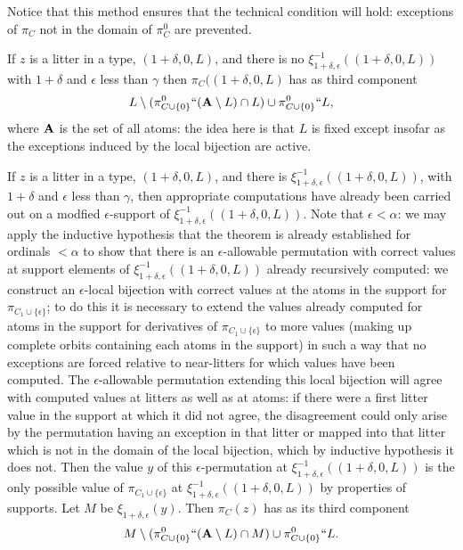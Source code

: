 \documentclass[12pt]{article}
\begin{document}
\begin{description}
Notice that this method ensures that the technical condition will hold:  exceptions of $\pi_C$ not in the domain of $\pi^0_C$ are prevented.

If $z$ is a litter in a type, $(1+\delta,0,L)$, and there is no $\xi^{-1}_{1+\delta,\epsilon}((1+\delta,0,L))$ with $1+\delta$ and $\epsilon$ less than $\gamma$ then $\pi_C((1+\delta,0,L)$ has as third
component $$L \setminus (\pi^0_{C\cup \{0\}}``({\bf A} \setminus L) \cap L) \cup \pi^0_{C\cup \{0\}}``L,$$ where ${\bf A}$ is the set of all atoms:  the idea here is that $L$ is fixed except insofar as the exceptions induced by the local bijection are active.

If $z$ is a litter in a type, $(1+\delta,0,L)$, and there is $\xi^{-1}_{1+\delta,\epsilon}((1+\delta,0,L))$, with $1+\delta$ and $\epsilon$ less than $\gamma$, then appropriate computations have
already been carried out on a modfied $\epsilon$-support of $\xi^{-1}_{1+\delta,\epsilon}((1+\delta,0,L))$.   Note that $\epsilon <\alpha$:  we may apply the inductive hypothesis that the theorem is already established for ordinals $<\alpha$ to show that there is an $\epsilon$-allowable permutation with correct values at support elements of $\xi^{-1}_{1+\delta,\epsilon}((1+\delta,0,L))$ already recursively computed:  we construct an $\epsilon$-local bijection with correct values at the atoms in the support for $\pi_{C_1 \cup \{\epsilon\}}$;  to do this it is necessary to extend the values already computed for atoms in the support for derivatives of $\pi_{C_1 \cup \{\epsilon\}}$ to more values (making up complete orbits containing each atoms in the support) in such a way that no exceptions are forced relative to near-litters for which values have been computed.  The $\epsilon$-allowable permutation extending this
local bijection will agree with computed values at litters as well as at atoms:  if there were a first litter value in the support at which it did not agree, the disagreement could only arise by the permutation having an exception in that litter or mapped into that litter which is not in the domain of the local bijection, which by inductive hypothesis it does not.  Then the value $y$ of this
$\epsilon$-permutation at $\xi^{-1}_{1+\delta,\epsilon}((1+\delta,0,L))$ is the only possible value of $\pi_{C_1 \cup \{\epsilon\}}$ at $\xi^{-1}_{1+\delta,\epsilon}((1+\delta,0,L))$ by properties of supports.  Let $M$ be $\xi_{1+\delta,\epsilon}(y)$.  Then $\pi_C(z)$ has as its third component $$M \setminus (\pi^0_{C\cup\{0\}}``({\bf A} \setminus L) \cap M) \cup \pi^0_{C\cup \{0\}}``L.$$


\end{description}
\end{document}
